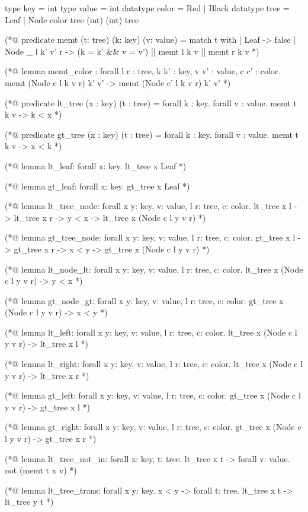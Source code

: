 \begin{cakeml}
type key = int
type value = int
datatype color = Red | Black
datatype tree = Leaf | Node color tree (int) (int) tree

(*@ predicate memt (t: tree) (k: key) (v: value) =
    match t with
    | Leaf -> false
    | Node _ l k' v' r -> (k = k' && v = v') || memt l k v || memt r k v *)

(*@ lemma memt_color :
    forall l r : tree, k k' : key, v v' : value, c c' : color.
    memt (Node c l k v r) k' v' -> memt (Node c' l k v r) k' v' *)

(*@ predicate lt_tree (x : key) (t : tree) =
    forall k : key. forall v : value. memt t k v -> k < x *)

(*@ predicate gt_tree (x : key) (t : tree) =
    forall k : key. forall v : value. memt t k v -> x < k *)

(*@ lemma lt_leaf: forall x: key. lt_tree x Leaf *)

(*@ lemma gt_leaf: forall x: key. gt_tree x Leaf *)

(*@ lemma lt_tree_node:
    forall x y: key, v: value, l r: tree, c: color.
      lt_tree x l -> lt_tree x r -> y < x -> lt_tree x (Node c l y v r) *)

(*@ lemma gt_tree_node:
    forall x y: key, v: value, l r: tree, c: color.
      gt_tree x l -> gt_tree x r -> x < y -> gt_tree x (Node c l y v r) *)

(*@ lemma lt_node_lt:
    forall x y: key, v: value, l r: tree, c: color.
      lt_tree x (Node c l y v r) -> y < x *)

(*@ lemma gt_node_gt:
    forall x y: key, v: value, l r: tree, c: color.
      gt_tree x (Node c l y v r) -> x < y *)

(*@ lemma lt_left:
    forall x y: key, v: value, l r: tree, c: color.
      lt_tree x (Node c l y v r) -> lt_tree x l *)

(*@ lemma lt_right:
    forall x y: key, v: value, l r: tree, c: color.
      lt_tree x (Node c l y v r) -> lt_tree x r *)

(*@ lemma gt_left:
    forall x y: key, v: value, l r: tree, c: color.
      gt_tree x (Node c l y v r) -> gt_tree x l *)

(*@ lemma gt_right:
    forall x y: key, v: value, l r: tree, c: color.
      gt_tree x (Node c l y v r) -> gt_tree x r *)

(*@ lemma lt_tree_not_in:
    forall x: key, t: tree. lt_tree x t -> forall v: value. not (memt t x v) *)

(*@ lemma lt_tree_trans:
    forall x y: key. x < y -> forall t: tree. lt_tree x t -> lt_tree y t *)


\end{cakeml}
